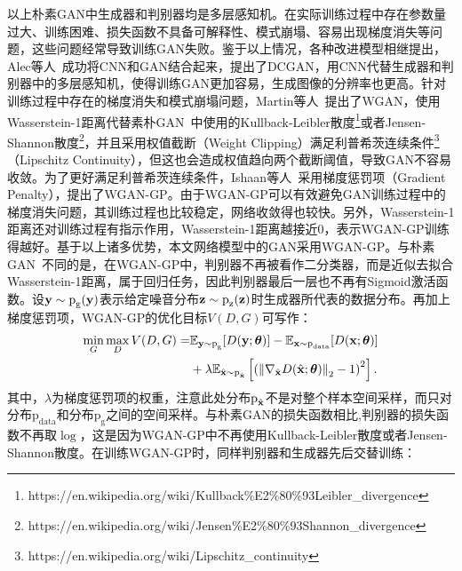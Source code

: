 以上朴素GAN中生成器和判别器均是多层感知机。在实际训练过程中存在参数量过大、训练困难、损失函数不具备可解释性、模式崩塌、容易出现梯度消失等问题，这些问题经常导致训练GAN失败。鉴于以上情况，各种改进模型相继提出，Alec等人~\cite{radford2015unsupervised}成功将CNN和GAN结合起来，提出了DCGAN，用CNN代替生成器和判别器中的多层感知机，使得训练GAN更加容易，生成图像的分辨率也更高。针对训练过程中存在的梯度消失和模式崩塌问题，Martin等人~\cite{arjovsky2017wasserstein}提出了WGAN，使用Wasserstein-1距离代替素朴GAN~\cite{goodfellow2014generative}中使用的Kullback-Leibler散度\footnote{https://en.wikipedia.org/wiki/Kullback\%E2\%80\%93Leibler\_divergence}或者Jensen-Shannon散度\footnote{https://en.wikipedia.org/wiki/Jensen\%E2\%80\%93Shannon\_divergence}，并且采用权值截断（Weight Clipping）满足利普希茨连续条件\footnote{https://en.wikipedia.org/wiki/Lipschitz\_continuity}（Lipschitz Continuity），但这也会造成权值趋向两个截断阈值，导致GAN不容易收敛。为了更好满足利普希茨连续条件，Ishaan等人~\cite{gulrajani2017improved}采用梯度惩罚项（Gradient Penalty），提出了WGAN-GP。由于WGAN-GP可以有效避免GAN训练过程中的梯度消失问题，其训练过程也比较稳定，网络收敛得也较快。另外，Wasserstein-1距离还对训练过程有指示作用，Wasserstein-1距离越接近0，表示WGAN-GP训练得越好。基于以上诸多优势，本文网络模型中的GAN采用WGAN-GP。与朴素GAN~\cite{goodfellow2014generative}不同的是，在WGAN-GP中，判别器不再被看作二分类器，而是近似去拟合Wasserstein-1距离，属于回归任务，因此判别器最后一层也不再有Sigmoid激活函数。设$\mathbf{y}\sim \text{p}_\text{g}(\mathbf{y})$表示给定噪音分布$\mathbf{z}\sim \text{p}_{\text{z}}(\mathbf{z})$时生成器所代表的数据分布。再加上梯度惩罚项，WGAN-GP的优化目标$V(D, G)$可写作：
\begin{equation}\label{wgan_gp_loss_func}
  \begin{aligned}
	\min _{G} \max _{D} V(D, G)=&\mathbb{E}_{\mathbf{y} \sim \text{p}_{\text{g}}}[D(\mathbf{y};\mbox{\boldmath $\theta$})]-\mathbb{E}_{\mathbf{x} \sim \text{p}_{\text{data}}}[D(\mathbf{x};\mbox{\boldmath $\theta$})] \\ & +\lambda \mathbb{E}_{\hat{\mathbf{x}} \sim \text{p}_{\hat{\mathbf{x}}}}\left[\left(\left\|\nabla_{\hat{\mathbf{x}}}D(\hat{\mathbf{x}};\mbox{\boldmath $\theta$})\right\|_{2}-1\right)^{2}\right].
  \end{aligned}
\end{equation}
其中，$\lambda$为梯度惩罚项的权重，注意此处分布$\text{p}_{\hat{\mathbf{x}}}$不是对整个样本空间采样，而只对分布$\text{p}_{\text{data}}$和分布$\text{p}_{\text{g}}$之间的空间采样。与朴素GAN的损失函数相比,判别器的损失函数不再取$\log$，这是因为WGAN-GP中不再使用Kullback-Leibler散度或者Jensen-Shannon散度。在训练WGAN-GP时，同样判别器和生成器先后交替训练：

